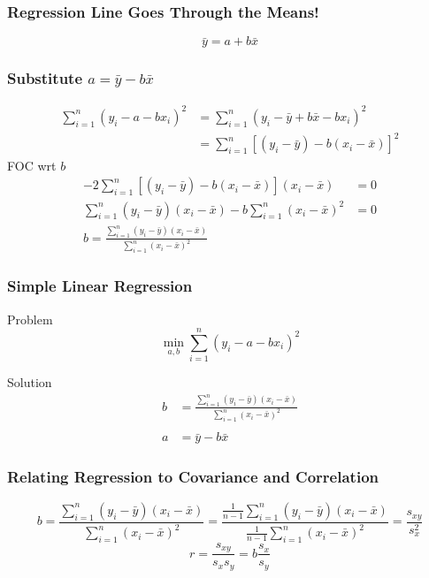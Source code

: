 \documentclass{beamer}
\begin{document}
\begin{frame}
\frametitle{Regression Line Goes Through the Means!}
	 \Huge
	$$
	\boxed{\bar{y} = a + b\bar{x}}
	$$
\end{frame}

\begin{frame}
\frametitle{Substitute $a = \bar{y} - b \bar{x}$}
	\small
	\begin{align*}
		\sum_{i = 1}^n (y_i - a - b x_i)^2 &= \sum_{i = 1}^n (y_i - \bar{y} + b\bar{x} - b x_i)^2
		\\
		&= \sum_{i = 1}^n \left[ \left(y_i - \bar{y}\right) - b\left(x_i - \bar{x}\right) \right]^2
	\end{align*}
	\alert{FOC wrt $b$}
	\begin{align*}
		-2\sum_{i = 1}^n \left[\left(y_i - \bar{y}\right) - b\left(x_i - \bar{x}\right) \right]\left(x_i - 				\bar{x} \right) &= 0
		\\
		\sum_{i = 1}^n \left(y_i - \bar{y}\right)\left(x_i - \bar{x} \right) - b\sum_{i = 1}^n \left(x_i - 				\bar{x}\right)^2 &= 0
		\\
		b = \frac{\sum_{i = 1}^n \left(y_i - \bar{y}\right)\left(x_i - \bar{x} \right)}{\sum_{i = 1}^n 				\left(x_i - \bar{x}\right)^2}
	\end{align*}
\end{frame}

\begin{frame}
\frametitle{Simple Linear Regression}
	\begin{block}{Problem}
	$$
	\min_{a,b}  \sum_{i = 1}^n (y_i - a - b x_i)^2
	$$
	\end{block}
	\begin{block}{Solution}
		\begin{align*}
			b &= \frac{\sum_{i = 1}^n \left(y_i - \bar{y}\right)\left(x_i - \bar{x} \right)}{\sum_{i = 1}^n 				\left(x_i - \bar{x}\right)^2}
			\\
			\\
			a &= \bar{y} - b\bar{x}
		\end{align*}
	\end{block}
\end{frame}

\begin{frame}
\frametitle{Relating Regression to Covariance and Correlation}
		$$
		b = \frac{\sum_{i = 1}^n \left(y_i - \bar{y}\right)\left(x_i - \bar{x} \right)}{\sum_{i = 1}^n 				\left(x_i - \bar{x}\right)^2} = \frac{\frac{1}{n-1}\sum_{i=1}^n \left(y_i - \bar{y}\right)\left(x_i - 			\bar{x} \right)}{\frac{1}{n-1}\sum_{i=1}^n \left(x_i - \bar{x}\right)^2} = \frac{s_{xy}}{s_x^2}
		$$
		$$
		r = \frac{s_{xy}}{s_x s_y} = b \frac{s_x}{s_y}
		$$		
\end{frame}
\end{document}
